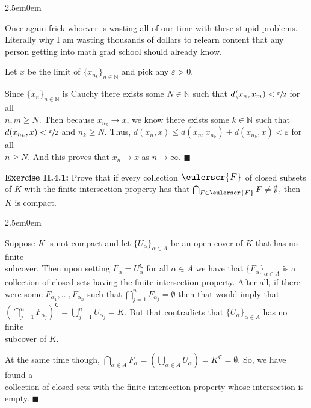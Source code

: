 \documentclass{book}
\newcommand{\mathcalli}[1]{\text{\scalebox{1.11}{$\eulerscr{#1}$}}}
\newcommand{\HexOne}{%
   \color{Purple}%
   \fontsize{12}{13}\selectfont%
}
\newenvironment{myIndent}{%
   \begin{adjustwidth}{2.5em}{0em}%
}{%
   \end{adjustwidth}%
}
\newcommand{\blab}[1]{\textbf{#1}}
\newcommand{\comp}{\mathsf{C}}
\newcommand{\retTwo}{\hfill\bigbreak}
\begin{document}
\begin{myIndent}\HexOne
	Once again frick whoever is wasting all of our time with these stupid problems. Literally why I am wasting thousands of dollars to relearn content that any person getting into math grad school should already know.\retTwo

	Let $x$ be the limit of $\{x_{n_k}\}_{n \in \mathbb{N}}$ and pick any $\varepsilon > 0$.\newpage 
	
	Since $\{x_n\}_{n \in \mathbb{N}}$ is Cauchy there exists some $N \in \mathbb{N}$ such that $d(x_n, x_m) < \sfrac{\varepsilon}{2}$ for all\\ [1pt] $n, m \geq N$. Then because $x_{n_k} \to x$, we know there exists some $k \in \mathbb{N}$ such that\\ [1pt] $d(x_{n_k}, x) < \sfrac{\varepsilon}{2}$ and $n_k \geq N$. Thus, $d(x_n, x) \leq d(x_n, x_{n_k}) + d(x_{n_k}, x) < \varepsilon$ for all\\ [1pt] $n \geq N$. And this proves that $x_n \to x$ as $n \to \infty$. $\blacksquare$\retTwo
\end{myIndent}

\blab{Exercise II.4.1:} Prove that if every collection $\mathcalli{F}$ of closed subsets of $K$ with the finite intersection property has that $\bigcap_{F \in \mathcalli{F}} F \neq \emptyset$, then $K$ is compact.

\begin{myIndent}\HexOne
	Suppose $K$ is not compact and let $\{U_\alpha\}_{\alpha \in A}$ be an open cover of $K$ that has no finite\\ subcover. Then upon setting $F_\alpha = U_\alpha^\comp$ for all $\alpha \in A$ we have that $\{F_\alpha\}_{\alpha \in A}$ is a\\ collection of closed sets having the finite intersection property. After all, if there\\ were some $F_{\alpha_1}, \ldots, F_{\alpha_n}$ such that $\bigcap_{j=1}^n F_{\alpha_j} = \emptyset$ then that would imply that\\ [-1pt] $(\bigcap_{j=1}^n F_{\alpha_j})^\comp = \bigcup_{j=1}^n U_{\alpha_j} = K$. But that contradicts that $\{U_\alpha\}_{\alpha \in A}$ has no finite\\ [1pt] subcover of $K$.\retTwo

	At the same time though, $\bigcap_{\alpha \in A} F_\alpha = (\bigcup_{\alpha \in A} U_\alpha) = K^\comp = \emptyset$. So, we have found a\\ collection of closed sets with the finite intersection property whose intersection is\\ empty.  $\blacksquare$\retTwo
\end{myIndent}
\end{document}
